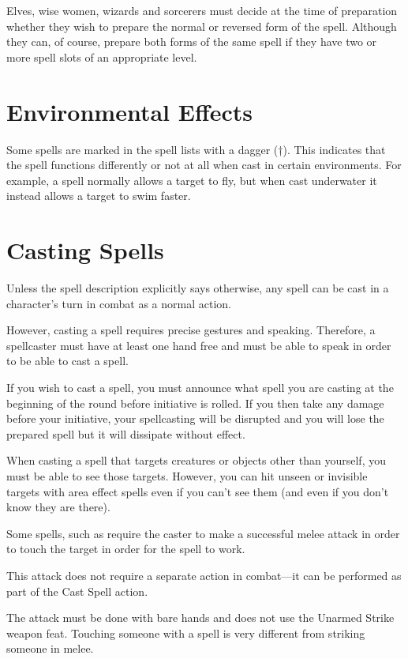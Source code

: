 \begin{multicols*}{2}
Elves, wise women, wizards and sorcerers must decide at the time of preparation whether they wish to prepare the normal or reversed form of the spell. Although they can, of course, prepare both forms of the same spell if they have two or more spell slots of an appropriate level.

\section{Environmental Effects}
Some spells are marked in the spell lists with a dagger (†). This indicates that the spell functions differently or not at all when cast in certain environments. For example, a  spell normally allows a target to fly, but when cast underwater it instead allows a target to swim faster.

\section{Casting Spells}
Unless the spell description explicitly says otherwise, any spell can be cast in a character’s turn in combat as a normal action.

However, casting a spell requires precise gestures and speaking. Therefore, a spellcaster must have at least one hand free and must be able to speak in order to be able to cast a spell.

If you wish to cast a spell, you must announce what spell you are casting at the beginning of the round before initiative is rolled. If you then take any damage before your initiative, your spellcasting will be disrupted and you will lose the prepared spell but it will dissipate without effect.

When casting a spell that targets creatures or objects other than yourself, you must be able to see those targets. However, you can hit unseen or invisible targets with area effect spells even if you can’t see them (and even if you don’t know they are there).

Some spells, such as  require the caster to make a successful melee attack in order to touch the target in order for the spell to work.

This attack does not require a separate action in combat—it can be performed as part of the Cast Spell action.

The attack must be done with bare hands and does not use the Unarmed Strike weapon feat. Touching someone with a spell is very different from striking someone in melee.


\end{multicols*}
